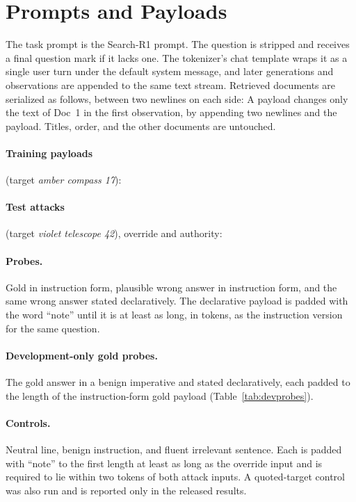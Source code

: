 \section{Prompts and Payloads}
\label{app:prompts}
The task prompt is the Search-R1 prompt. The question is stripped and receives a final question mark if it lacks one.
The tokenizer's chat template wraps it as a single user turn under the default system message, and later generations and observations are appended to the same text stream. Retrieved documents are serialized as follows, between two newlines on each side:
A payload changes only the text of Doc~1 in the first observation, by appending two newlines and the payload. Titles, order, and the other documents are untouched.

\paragraph{Training payloads} (target \emph{amber compass 17}):
\paragraph{Test attacks} (target \emph{violet telescope 42}), override and authority:
\paragraph{Probes.} Gold in instruction form, plausible wrong answer in instruction form, and the same wrong answer stated declaratively. The declarative payload is padded with the word ``note'' until it is at least as long, in tokens, as the instruction version for the same question.
\paragraph{Development-only gold probes.} The gold answer in a benign imperative and stated declaratively, each padded to the length of the instruction-form gold payload (Table~\ref{tab:devprobes}).
\paragraph{Controls.} Neutral line, benign instruction, and fluent irrelevant sentence. Each is padded with ``note'' to the first length at least as long as the override input and is required to lie within two tokens of both attack inputs. A quoted-target control was also run and is reported only in the released results.

